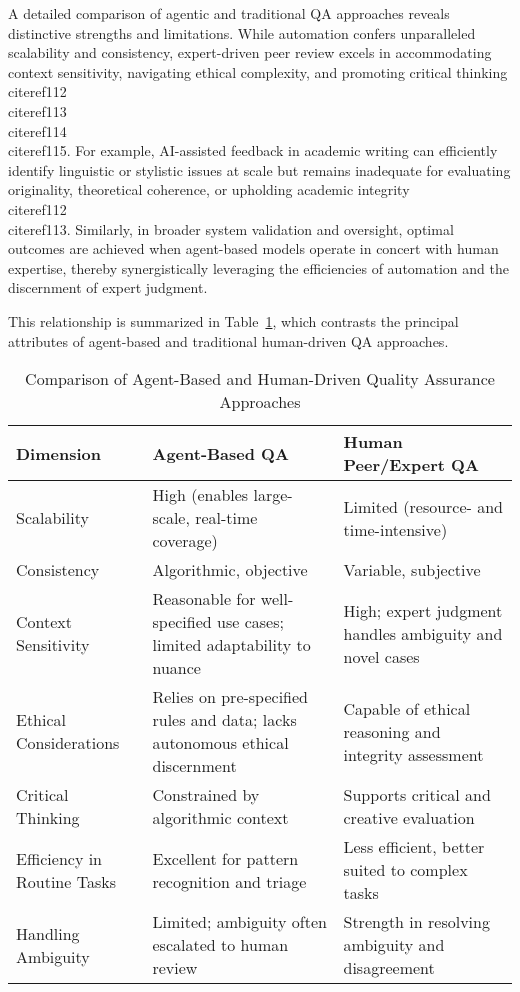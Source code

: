 \documentclass[11pt]{article}
\begin{document}
A detailed comparison of agentic and traditional QA approaches reveals distinctive strengths and limitations. While automation confers unparalleled scalability and consistency, expert-driven peer review excels in accommodating context sensitivity, navigating ethical complexity, and promoting critical thinking \\cite{ref112}\\cite{ref113}\\cite{ref114}\\cite{ref115}. For example, AI-assisted feedback in academic writing can efficiently identify linguistic or stylistic issues at scale but remains inadequate for evaluating originality, theoretical coherence, or upholding academic integrity \\cite{ref112}\\cite{ref113}. Similarly, in broader system validation and oversight, optimal outcomes are achieved when agent-based models operate in concert with human expertise, thereby synergistically leveraging the efficiencies of automation and the discernment of expert judgment. 

This relationship is summarized in Table~\ref{tab:qa_comparison}, which contrasts the principal attributes of agent-based and traditional human-driven QA approaches.

\begin{table}[ht]
\centering
\caption{Comparison of Agent-Based and Human-Driven Quality Assurance Approaches}
\label{tab:qa_comparison}
\begin{tabular}{|p{4cm}|p{5cm}|p{5cm}|}
\hline
\textbf{Dimension} & \textbf{Agent-Based QA} & \textbf{Human Peer/Expert QA} \\
\hline
Scalability & High (enables large-scale, real-time coverage) & Limited (resource- and time-intensive) \\
\hline
Consistency & Algorithmic, objective & Variable, subjective \\
\hline
Context Sensitivity & Reasonable for well-specified use cases; limited adaptability to nuance & High; expert judgment handles ambiguity and novel cases \\
\hline
Ethical Considerations & Relies on pre-specified rules and data; lacks autonomous ethical discernment & Capable of ethical reasoning and integrity assessment \\
\hline
Critical Thinking & Constrained by algorithmic context & Supports critical and creative evaluation \\
\hline
Efficiency in Routine Tasks & Excellent for pattern recognition and triage & Less efficient, better suited to complex tasks \\
\hline
Handling Ambiguity & Limited; ambiguity often escalated to human review & Strength in resolving ambiguity and disagreement \\
\hline
\end{tabular}
\end{table}
\end{document}
